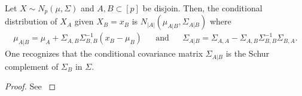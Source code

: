     
    



\newpage
\begin{lemma} \label{lem-gaussian-cond}
    Let $X \sim N_p(\mu, \Sigma)$ and $A, B \subset [p]$ be disjoin. Then, the conditional distribution of $X_A$ given $X_B = x_B$ is $N_|A|(\mu_{A|B}, \Sigma_{A|B})$ where
    \begin{align*}
        \mu_{A|B} = \mu_A + \Sigma_{A,B}\Sigma^{-1}_{B,B}(x_B - \mu_B) && \textrm{and} && \Sigma_{A|B} = \Sigma_{A,A} - \Sigma_{A,B}\Sigma^{-1}_{B,B}\Sigma_{B,A}.
    \end{align*} 
    One recognizes that the conditional covariance matrix $\Sigma_{A|B}$ is the Schur complement of $\Sigma_B$ in $\Sigma$.
\end{lemma}

\begin{proof}
    See \cite[Proposition C.5]{lauritzen1996}
\end{proof}
